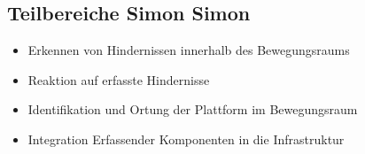 \subsection{Teilbereiche Simon Simon}
\begin{itemize}
\item Erkennen von Hindernissen innerhalb des Bewegungsraums
\item Reaktion auf erfasste Hindernisse
\item Identifikation und Ortung der Plattform im Bewegungsraum
\item Integration Erfassender Komponenten in die Infrastruktur
\end{itemize}